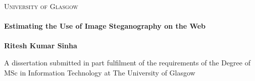 \begin{titlepage}
\begin{center}



\textsc{\LARGE University of Glasgow}\\[1.5cm]



\HRule \\[0.4cm]
{ \huge \bfseries Estimating the Use of Image Steganography on the Web}\\[0.4cm]

\HRule \\[1.5cm]

{\large \bfseries Ritesh Kumar Sinha }

\vfill

{\large A dissertation submitted in part fulfilment of the requirements of 
the Degree of MSc in Information Technology at The University of 
Glasgow}

\end{center}


\end{titlepage}

